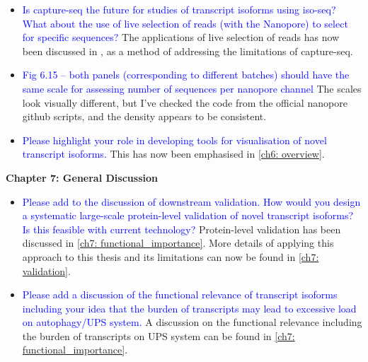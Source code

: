 \documentclass[a4paper,12pt,oneside]{report}
\begin{document}
\begin{itemize}
	\item \textcolor{blue}{Is capture-seq the future for studies of transcript isoforms using iso-seq? What about the use of live selection of reads (with the Nanopore) to select for specific sequences?}
	\newline The applications of live selection of reads has now been discussed in \label{ch6: limitation}, as a method of addressing the limitations of capture-seq.
	\item \textcolor{blue}{Fig 6.15 – both panels (corresponding to different batches) should have the same scale for assessing number of sequences per nanopore channel}
	\newline The scales look visually different, but I've checked the code from the official nanopore github scripts, and the density appears to be consistent.  
	\item \textcolor{blue}{Please highlight your role in developing tools for visualisation of novel transcript isoforms.}
	\newline This has now been emphasised in \cref{ch6: overview}.
\end{itemize}

\vspace{1cm}
\textbf{Chapter 7: General Discussion}
\begin{itemize}
	\item \textcolor{blue}{Please add to the discussion of downstream validation. How would you design a systematic large-scale protein-level validation of novel transcript isoforms? Is this feasible with current technology?} 
	\newline Protein-level validation has been discussed in \cref{ch7: functional_importance}. More details of applying this approach to this thesis and its limitations can now be found in \cref{ch7: validation}.
	\item \textcolor{blue}{Please add a discussion of the functional relevance of transcript isoforms including your idea that the burden of transcripts may lead to excessive load on autophagy/UPS system.}
	\newline A discussion on the functional relevance including the burden of transcripts on UPS system can be found in \cref{ch7: functional_importance}.
\end{itemize}
\end{document}
